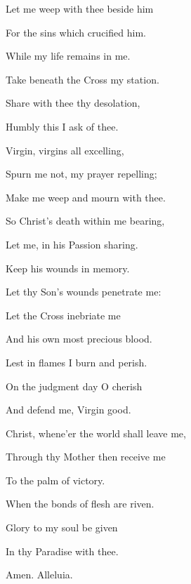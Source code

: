 \begin{multicols}{2}
\begin{hangparas}{1.25em}{1}
\vspace{0.75\baselineskip}

Let me weep with thee beside him

For the sins which crucified him.

While my life remains in me.%

\vspace{0.75\baselineskip}

Take beneath the Cross my station.

Share with thee thy desolation,

Humbly this I ask of thee.%

\vspace{0.75\baselineskip}

Virgin, virgins all excelling,

Spurn me not, my prayer repelling;

Make me weep and mourn with thee.%

\vspace{0.75\baselineskip}

So Christ's death within me bearing,

Let me, in his Passion sharing.

Keep his wounds in memory.%

\vspace{0.75\baselineskip}

Let thy Son's wounds penetrate me:

Let the Cross inebriate me

And his own most precious blood.%

\vspace{0.75\baselineskip}

Lest in flames I burn and perish.

On the judgment day O cherish

And defend me, Virgin good.%

\vspace{0.75\baselineskip}

Christ, whene'er the world shall leave me,

Through thy Mother then receive me

To the palm of victory.%

\vspace{0.75\baselineskip}

When the bonds of flesh are riven.

Glory to my soul be given

In thy Paradise with thee.

Amen. Alleluia.
\end{hangparas}
\end{multicols}
